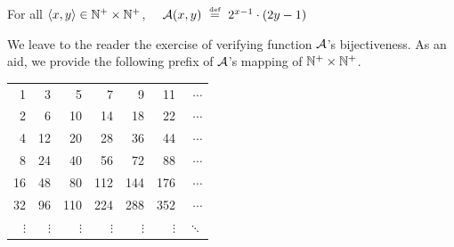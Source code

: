 \medskip

\noindent
For all $\langle x,y \rangle \in \mathbb{N}^+ \times \mathbb{N}^+$,
\ \ 
$\a(x,y) \ \eqdef \ 2^{x-1} \cdot (2y -1)$

\noindent
We leave to the reader the exercise of verifying function $\mbox{$\cal A$}$'s bijectiveness.  As an aid, we provide the following prefix of $\mbox{$\cal A$}$'s mapping of $\mathbb{N}^+ \times \mathbb{N}^+$.
\begin{center}
\begin{tabular}{r|r|r|r|r|r|r}                                                               
 1 &  3 &   5 &   7 &   9 &  11 & $\cdots$ \\                                      
 2 &  6 &  10 &  14 &  18 &  22 & $\cdots$ \\                                      
 4 & 12 &  20 &  28 &  36 &  44 & $\cdots$ \\                                      
 8 & 24 &  40 &  56 &  72 &  88 & $\cdots$ \\                                            
16 & 48 &  80 & 112 & 144 & 176 & $\cdots$ \\
32 & 96 & 110 & 224 & 288 & 352 & $\cdots$ \\                                      
$\vdots$ & $\vdots$ & $\vdots$  & $\vdots$ & $\vdots$ & $\vdots$ & $\ddots$
\end{tabular} 
\end{center}
